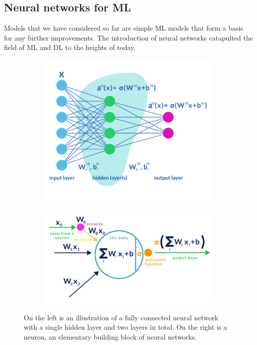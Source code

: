 \subsection{Neural networks for ML}
Models that we have considered so far are simple ML models that form a basis for any further improvements. The introduction of neural networks catapulted the field of ML and DL to the heights of today. 
\begin{figure}[H]
	\centering
	\begin{subfigure}[c]{0.5\textwidth}
		\centering
		\includegraphics[width=\columnwidth]{figures/introduction/neuralNetwork.pdf}
	\end{subfigure}%
	\begin{subfigure}[c]{0.5\textwidth}
		\centering
		\includegraphics[width=\columnwidth]{figures/introduction/neuron.pdf}
	\end{subfigure}
	\caption{On the left is an illustration of a fully connected neural network with a single hidden layer and two layers in total. On the right is a neuron, an elementary building block of neural networks.}
	\label{gr:neuronNetwork}
\end{figure}
